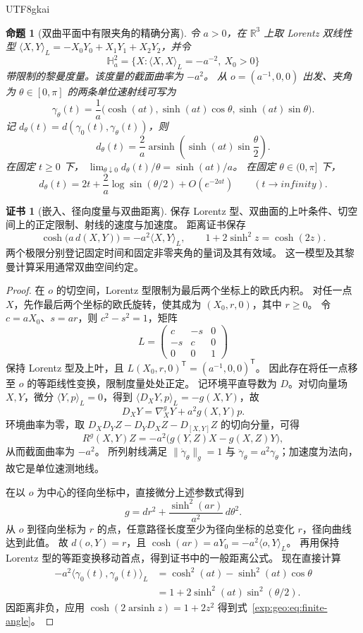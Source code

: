 \documentclass[12pt,a4paper,openany,notitlepage]{report}
\theoremstyle{plain}
\newtheorem{proposition}[theorem]{命题}
\theoremstyle{definition}
\newtheorem*{certificate}{证书}
\theoremstyle{remark}
\def\infty{infinity}\def\Gamma{Gamma}\def\Phi{Phi}%
\begin{document}
\begin{CJK*}{UTF8}{gkai}
\begin{proposition}[双曲平面中有限夹角的精确分离]
\label{exp:geo:prop:hyperbolic-separation}
令 $a>0$，在 $\mathbb R^3$ 上取 Lorentz 双线性型
$\langle X,Y\rangle_L=-X_0Y_0+X_1Y_1+X_2Y_2$，并令
\[
\mathbb H_a^2=\{X:\langle X,X\rangle_L=-a^{-2},\ X_0>0\}
\]
带限制的黎曼度量。该度量的截面曲率为 $-a^2$。
从 $o=(a^{-1},0,0)$ 出发、夹角为 $\theta\in[0,\pi]$ 的两条单位速射线可写为
\[
\gamma_\theta(t)=\frac1a
\bigl(\cosh(at),\sinh(at)\cos\theta,\sinh(at)\sin\theta\bigr).
\]
记 $d_\theta(t)=d(\gamma_0(t),\gamma_\theta(t))$，则
\begin{equation}
\label{exp:geo:eq:finite-angle}
d_\theta(t)=\frac2a\operatorname{arsinh}
\left(\sinh(at)\sin\frac\theta2\right).
\end{equation}
在固定 $t\ge0$ 下，
$\lim_{\theta\downarrow0}d_\theta(t)/\theta=\sinh(at)/a$。
在固定 $\theta\in(0,\pi]$ 下，
\[
d_\theta(t)=2t+\frac2a\log\sin(\theta/2)+O(e^{-2at})
\qquad(t\to\infty).
\]
\end{proposition}
\begin{certificate}[嵌入、径向度量与双曲距离]
保存 Lorentz 型、双曲面的上叶条件、切空间上的正定限制、射线的速度与加速度。
距离证书保存
\[
\cosh\bigl(a\,d(X,Y)\bigr)=-a^2\langle X,Y\rangle_L,
\qquad
1+2\sinh^2z=\cosh(2z).
\]
两个极限分别登记固定时间和固定非零夹角的量词及其有效域。
这一模型及其黎曼计算采用通常双曲空间约定\cite{ExtLeeRiemann}。
\end{certificate}
\begin{proof}
在 $o$ 的切空间，Lorentz 型限制为最后两个坐标上的欧氏内积。
对任一点 $X$，先作最后两个坐标的欧氏旋转，使其成为 $(X_0,r,0)$，其中 $r\ge0$。
令 $c=aX_0$、$s=ar$，则 $c^2-s^2=1$，矩阵
\[
L=\begin{pmatrix}c&-s&0\\-s&c&0\\0&0&1\end{pmatrix}
\]
保持 Lorentz 型及上叶，且 $L(X_0,r,0)^{\mathsf T}=(a^{-1},0,0)^{\mathsf T}$。
因此存在将任一点移至 $o$ 的等距线性变换，限制度量处处正定。
记环境平直导数为 $D$。对切向量场 $X,Y$，微分 $\langle Y,p\rangle_L=0$，得到
$\langle D_XY,p\rangle_L=-g(X,Y)$，故
\[
D_XY=\nabla^g_XY+a^2g(X,Y)p.
\]
环境曲率为零，取 $D_XD_YZ-D_YD_XZ-D_{[X,Y]}Z$ 的切向分量，可得
\[
R^g(X,Y)Z=-a^2\bigl(g(Y,Z)X-g(X,Z)Y\bigr),
\]
从而截面曲率为 $-a^2$。
所列射线满足 $\lVert\dot\gamma_\theta\rVert_g=1$ 与
$\ddot\gamma_\theta=a^2\gamma_\theta$；加速度为法向，故它是单位速测地线。

在以 $o$ 为中心的径向坐标中，直接微分上述参数式得到
\[
g=dr^2+\frac{\sinh^2(ar)}{a^2}\,d\theta^2.
\]
从 $o$ 到径向坐标为 $r$ 的点，任意路径长度至少为径向坐标的总变化 $r$，径向曲线达到此值。
故 $d(o,Y)=r$，且 $\cosh(ar)=aY_0=-a^2\langle o,Y\rangle_L$。
再用保持 Lorentz 型的等距变换移动首点，得到证书中的一般距离公式。
现在直接计算
\[
\begin{aligned}
-a^2\langle\gamma_0(t),\gamma_\theta(t)\rangle_L
&=\cosh^2(at)-\sinh^2(at)\cos\theta\\
&=1+2\sinh^2(at)\sin^2(\theta/2).
\end{aligned}
\]
因距离非负，应用 $\cosh(2\operatorname{arsinh}z)=1+2z^2$ 得到式~\eqref{exp:geo:eq:finite-angle}。


\end{proof}
\end{CJK*}
\end{document}

